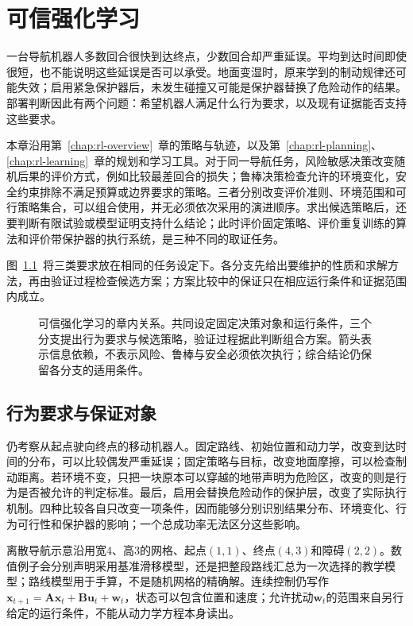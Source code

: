 \chapter{可信强化学习}
\label{chap:rl-trustworthy}

一台导航机器人多数回合很快到达终点，少数回合却严重延误。平均到达时间即使很短，也不能说明这些延误是否可以承受。地面变湿时，原来学到的制动规律还可能失效；启用紧急保护器后，未发生碰撞又可能是保护器替换了危险动作的结果。部署判断因此有两个问题：希望机器人满足什么行为要求，以及现有证据能否支持这些要求。

本章沿用第~\ref{chap:rl-overview}~章的策略与轨迹，以及第~\ref{chap:rl-planning}、\ref{chap:rl-learning}~章的规划和学习工具。对于同一导航任务，风险敏感决策改变随机后果的评价方式，例如比较最差回合的损失；鲁棒决策检查允许的环境变化，安全约束排除不满足预算或边界要求的策略。三者分别改变评价准则、环境范围和可行策略集合，可以组合使用，并无必须依次采用的演进顺序。求出候选策略后，还要判断有限试验或模型证明支持什么结论；此时评价固定策略、评价重复训练的算法和评价带保护器的执行系统，是三种不同的取证任务。

图~\ref{fig:rl-trustworthy-map}~将三类要求放在相同的任务设定下。各分支先给出要维护的性质和求解方法，再由验证过程检查候选方案；方案比较中的保证只在相应运行条件和证据范围内成立。

\begin{figure}[t]
  \centering
  
  \caption{可信强化学习的章内关系。共同设定固定决策对象和运行条件，三个分支提出行为要求与候选策略，验证过程据此判断组合方案。箭头表示信息依赖，不表示风险、鲁棒与安全必须依次执行；综合结论仍保留各分支的适用条件。}
  \label{fig:rl-trustworthy-map}
\end{figure}

\section{行为要求与保证对象}
\label{sec:rl-trustworthy-requirements}

仍考察从起点驶向终点的移动机器人。固定路线、初始位置和动力学，改变到达时间的分布，可以比较偶发严重延误；固定策略与目标，改变地面摩擦，可以检查制动距离。若环境不变，只把一块原本可以穿越的地带声明为危险区，改变的则是行为是否被允许的判定标准。最后，启用会替换危险动作的保护层，改变了实际执行机制。四种比较各自只改变一项条件，因而能够分别识别结果分布、环境变化、行为可行性和保护器的影响；一个总成功率无法区分这些影响。

离散导航示意沿用宽4、高3的网格、起点$(1,1)$、终点$(4,3)$和障碍$(2,2)$。数值例子会分别声明采用基准滑移模型，还是把整段路线汇总为一次选择的教学模型；路线模型用于手算，不是随机网格的精确解。连续控制仍写作$\bm{x}_{t+1}=\bm{A}\bm{x}_t+\bm{B}\bm{u}_t+\bm{w}_t$，状态可以包含位置和速度；允许扰动$\bm{w}_t$的范围来自另行给定的运行条件，不能从动力学方程本身读出。

